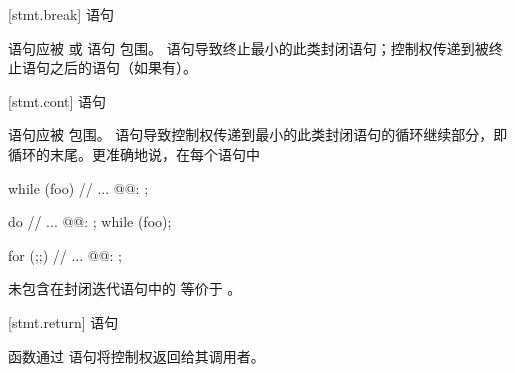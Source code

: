 [stmt.break]{  语句}%

\pnum
{} 语句应被
%
%
 或  语句 包围。  语句导致终止最小的此类封闭语句；控制权传递到被终止语句之后的语句（如果有）。

[stmt.cont]{  语句}%

\pnum
{} 语句应被
%
 包围。 语句导致控制权传递到最小的此类封闭语句的循环继续部分，即循环的末尾。更准确地说，在每个语句中

\begin{minipage}{.30\hsize}
\begin{codeblock}
while (foo) {
  {
    // ...
  }
@@: ;
}
\end{codeblock}
\end{minipage}
\begin{minipage}{.30\hsize}
\begin{codeblock}
do {
  {
    // ...
  }
@@: ;
} while (foo);
\end{codeblock}
\end{minipage}
\begin{minipage}{.30\hsize}
\begin{codeblock}
for (;;) {
  {
    // ...
  }
@@: ;
}
\end{codeblock}
\end{minipage}

未包含在封闭迭代语句中的  等价于  。

[stmt.return]{  语句}%
%
%

\pnum
函数通过  语句将控制权返回给其调用者。

